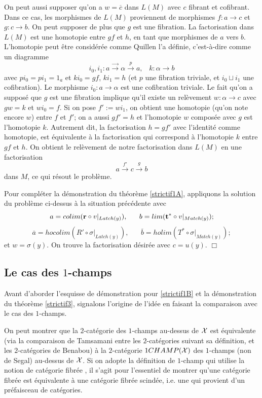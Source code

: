 \documentclass[12pt]{article}
\newcommand{\subnumero}[1]{\subsection*{#1}\phantomsection\addcontentsline{toc}{subsection}{#1}}
\newcommand{\eop}{\hfill $\Box$\vspace{.1in}}
\newcommand{\Xx}{{\cal X}}
\newcommand{\tworightarrows}{\stackrel{\displaystyle \rightarrow}{\rightarrow}}
\begin{document}
On peut aussi supposer qu'on
a $w=\overline{c}$ dans $L(M)$ avec $c$ fibrant et
cofibrant. Dans ce cas, les morphismes de $L(M)$ proviennent de morphismes
$f: a\rightarrow c$ et $g: c\rightarrow b$. On peut supposer de plus que $g$
est une fibration. La factorisation dans $L(M)$ est une homotopie entre $gf$ et
$h$, en tant que morphismes de $a$ vers $b$. L'homotopie peut \^etre
consid\'er\'ee
comme Quillen l'a d\'efinie, c'est-\`a-dire comme un diagramme
$$
i_0,i_1 :a\tworightarrows \alpha \stackrel{p}{\rightarrow} a ,\;\;\; k:\alpha
\rightarrow b
$$
avec $pi_0=pi_1=1_a$ et $ki_0=gf$, $ki_1=h$ (et $p$ une fibration triviale, et
$i_0\sqcup i_1$ une cofibration). Le morphisme  $i_0:a\rightarrow \alpha$
est une
cofibration triviale. Le fait qu'on a suppos\'e
que $g$ est une fibration implique qu'il
existe un rel\`evement $w: \alpha \rightarrow c$ avec $gw=k$
et $wi_0= f$. Si on pose $f':= wi_1$, on obtient une homotopie (qu'on note
encore $w$) entre $f$ et $f'$;
on a aussi $gf'=h$ et l'homotopie $w$ compos\'ee avec
$g$ est l'homotopie $k$. Autrement dit, la factorisation $h=gf'$ avec
l'identit\'e comme homotopie, est \'equivalente \`a la factorisation qui
correspond \`a l'homotopie $k$ entre $gf$ et $h$. On obtient le rel\`evement de
notre factorisation dans $L(M)$ en une factorisation
$$
a\stackrel{f'}{\rightarrow}c\stackrel{g}{\rightarrow}b
$$
dans $M$, ce qui r\'esout le probl\`eme.

Pour compl\'eter la d\'emonstration du th\'eor\`eme \ref{strictif1A},
appliquons la solution du
probl\`eme ci-dessus \`a la situation pr\'ec\'edente avec
$$
a= colim ({\bf r}\circ v|_{Latch (y)}),\;\;\;\;\;\;  b =
lim ({\bf t}^{\ast} \circ v|_{Match(y)});
$$
$$
\overline{a} = hocolim (R'\circ \sigma |_{Latch(y)}), \;\;\;\;\;\;
\overline{b}=  holim
(T^{\ast} \circ \sigma |_{Match(y)});
$$
et $w = \sigma (y)$. On trouve la factorisation d\'esir\'ee avec $c=u(y)$.
\eop



\subnumero{Le cas des \texorpdfstring{$1$}{1}-champs}

Avant d'aborder l'esquisse de d\'emonstration pour \ref{strictif1B}
et la d\'emonstration du th\'eo\-r\`e\-me \ref{strictif3}, signalons
l'origine de
l'id\'ee en faisant la comparaison avec le cas des $1$-champs.

On peut montrer que la $2$-cat\'egorie des $1$-champs au-dessus de $\Xx$
est \'equivalente (via la comparaison de Tamsamani \cite{Tamsamani} entre les
$2$-cat\'egories suivant sa d\'efinition, et les $2$-cat\'egories de Benabou)
\`a la $2$-cat\'egorie $1CHAMP(\Xx )$ des $1$-champs (non de Segal) au-dessus de
$\Xx$. Si on adopte la d\'efinition de $1$-champ qui utilise la notion de
cat\'egorie fibr\'ee \cite{SGA1}, il s'agit pour l'essentiel de montrer qu'une
cat\'egorie fibr\'ee est \'equivalente \`a une cat\'egorie fibr\'ee
scind\'ee, i.e. une qui provient d'un pr\'efaisceau de cat\'egories.
\end{document}
